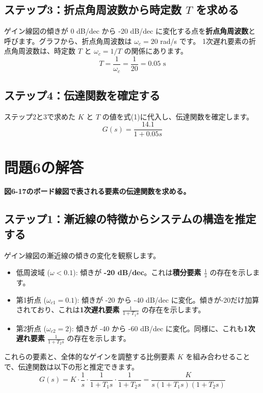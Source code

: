 \documentclass[11pt,a4paper]{ltjsarticle} %
\begin{document}
\subsection*{ステップ3：折点角周波数から時定数 $T$ を求める}
ゲイン線図の傾きが 0 dB/dec から -20 dB/dec に変化する点を\textbf{折点角周波数}と呼びます。グラフから、折点角周波数は $\omega_c = 20$ rad/s です。
1次遅れ要素の折点角周波数は、時定数 $T$ と $\omega_c = 1/T$ の関係にあります。
\begin{equation*}
    T = \frac{1}{\omega_c} = \frac{1}{20} = 0.05 \text{ s}
\end{equation*}

\subsection*{ステップ4：伝達関数を確定する}
ステップ2と3で求めた $K$ と $T$ の値を式(1)に代入し、伝達関数を確定します。
\begin{equation}
    G(s) = \frac{14.1}{1+0.05s}
\end{equation}

\section{問題6の解答}
\textbf{図6-17のボード線図で表される要素の伝達関数を求める。}

\subsection*{ステップ1：漸近線の特徴からシステムの構造を推定する}
ゲイン線図の漸近線の傾きの変化を観察します。
\begin{itemize}
    \item 低周波域 ($\omega < 0.1$): 傾きが \textbf{-20 dB/dec}。これは\textbf{積分要素 $\frac{1}{s}$} の存在を示します。
    \item 第1折点 ($\omega_{c1} = 0.1$): 傾きが -20 から -40 dB/dec に変化。傾きが-20だけ加算されており、これは\textbf{1次遅れ要素 $\frac{1}{1+T_1s}$} の存在を示します。
    \item 第2折点 ($\omega_{c2} = 2$): 傾きが -40 から -60 dB/dec に変化。同様に、これも\textbf{1次遅れ要素 $\frac{1}{1+T_2s}$} の存在を示します。
\end{itemize}
これらの要素と、全体的なゲインを調整する比例要素 $K$ を組み合わせることで、伝達関数は以下の形と推定できます。
\begin{equation}
    G(s) = K \cdot \frac{1}{s} \cdot \frac{1}{1+T_1s} \cdot \frac{1}{1+T_2s} = \frac{K}{s(1+T_1s)(1+T_2s)}
\end{equation}
\end{document}
